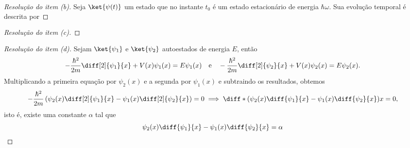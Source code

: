 \begin{proof}[Resolução do item (b)]
    Seja \(\ket{\psi(t)}\) um estado que no instante \(t_0\) é um estado estacionário de energia \(\hbar \omega\). Sua evolução temporal é descrita por
\end{proof}

\begin{proof}[Resolução do item (c)]

\end{proof}

\begin{proof}[Resolução do item (d)]
    Sejam \(\ket{\psi_1}\) e \(\ket{\psi_2}\) autoestados de energia \(E\), então
    \begin{equation*}
        -\frac{\hbar^2}{2m}\diff[2]{\psi_1}{x} + V(x)\psi_1(x) = E\psi_1(x) \quad\text{e}\quad
        -\frac{\hbar^2}{2m}\diff[2]{\psi_2}{x} + V(x)\psi_2(x) = E\psi_2(x).
    \end{equation*}
    Multiplicando a primeira equação por \(\psi_2(x)\) e a segunda por \(\psi_1(x)\) e subtraindo os resultados, obtemos
    \begin{equation*}
        -\frac{\hbar^2}{2m} \left(\psi_2(x) \diff[2]{\psi_1}{x} - \psi_1(x) \diff[2]{\psi_2}{x}\right) = 0 \implies \diff*{\left(\psi_2(x)\diff{\psi_1}{x}-\psi_1(x) \diff{\psi_2}{x}\right)}{x} = 0,
    \end{equation*}
    isto é, existe uma constante \(\alpha\) tal que
    \begin{equation*}
        \psi_2(x) \diff{\psi_1}{x} - \psi_1(x) \diff{\psi_2}{x} = \alpha
    \end{equation*}
    \todo
\end{proof}

